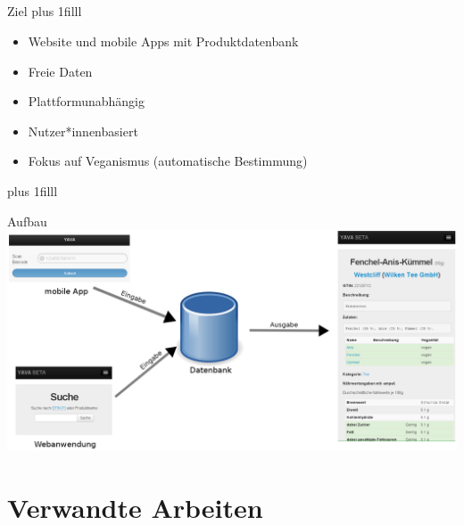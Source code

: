 \documentclass{beamer}
\begin{document}
\subsection*{}
\begin{frame}{Ziel}
	\vskip0pt plus 1filll
	\begin{exampleblock}{}
		\begin{itemize}
			\item Website und mobile Apps mit Produktdatenbank
			\item Freie Daten
			\item Plattformunabhängig
			\item Nutzer*innenbasiert
			\item Fokus auf Veganismus (automatische Bestimmung)
		\end{itemize}
	\end{exampleblock}
	\vskip0pt plus 1filll
\end{frame}

\begin{frame}{Aufbau}
	\centering
	\includegraphics[scale=0.19]{pics/konzept-2.png}
\end{frame}

\section{Verwandte Arbeiten}
\end{document}
